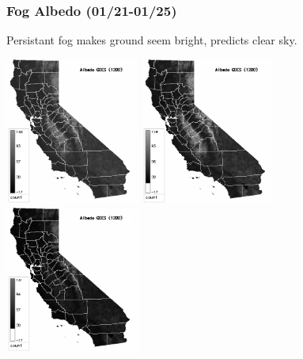 \documentclass{beamer}
\begin{document}
\begin{frame}
  \frametitle{Fog Albedo (01/21-01/25)}

  \begin{block}{}
    Persistant fog makes ground seem bright, predicts clear sky.
  \end{block}

  \includegraphics[width=0.33\textwidth]{2005-01-21/p1200.png}
  \includegraphics[width=0.33\textwidth]{2005-01-23/p1200.png}
  \includegraphics[width=0.33\textwidth]{2005-01-25/p1200.png}

\end{frame}

\end{document}
